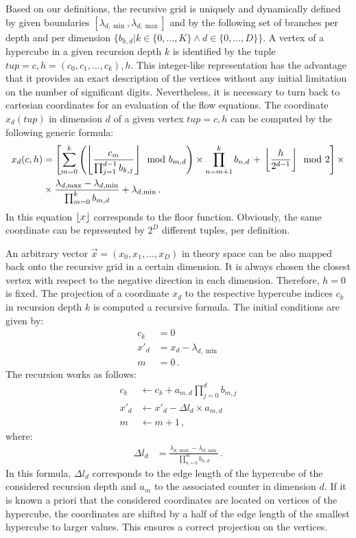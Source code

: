 \documentclass[paper=a4,11pt,bibliography=totoc]{scrartcl}
\DeclarePairedDelimiter\floor{\lfloor}{\rfloor}
\begin{document}
Based on our definitions, the recursive grid is uniquely and dynamically defined by given boundaries $[\lambda_{d,\min}, \lambda_{d,\max}]$ and by the following set of branches per depth and per dimension $\lbrace b_{k, d}|k\in\lbrace0,\ldots,K\rbrace \wedge d\in\lbrace0,\ldots,D\rbrace\rbrace$. A vertex of a hypercube in a given recursion depth $k$ is identified by the tuple $tup = c, h = \left(c_0, c_1, \ldots, c_k\right), h$. This integer-like representation has the advantage that it provides an exact description of the vertices without any initial limitation on the number of significant digits. Nevertheless, it is necessary to turn back to cartesian coordinates for an evaluation of the flow equations. The coordinate $x_d(tup)$ in dimension $d$ of a given vertex $tup=c, h$ can be computed by the following generic formula:
%
\begin{align}
\label{eq:indextocoor}
x_d(c, h) &= \left[\sum_{m=0}^k \left(\floor*{\frac{c_m}{\prod_{j=1}^{d-1} b_{k, j}}} \mod b_{m, d} \right) \times \prod_{n=m+1}^{k} b_{n, d} \,+\, \floor*{\frac{h}{2^{d-1}}} \mod 2\right] \times \nonumber\\
&\times \frac{\lambda_{d,\max} - \lambda_{d,\min}}{\prod_{m=0}^k b_{m, d}} + \lambda_{d,\min}\,.
\end{align}
%
In this equation $\floor*{x}$ corresponds to the floor function. Obviously, the same coordinate can be represented by $2^D$ different tuples, per definition.

An arbitrary vector $\vec{x} = \left(x_0, x_1, \ldots, x_D\right)$ in theory space can be also mapped back onto the recursive grid in a certain dimension. It is always chosen the closest vertex with respect to the negative direction in each dimension. Therefore, $h=0$ is fixed. The projection of a coordinate $x_d$ to the respective hypercube indices $c_k$ in recursion depth $k$ is computed a recursive formula. The initial conditions are given by:
%
\begin{align}
c_k &= 0 \nonumber\\
x'_d &= x_d - \lambda_{d,\min} \nonumber\\
m &= 0\,.
\end{align}
%
The recursion works as follows:
%
\begin{align}
c_k &\leftarrow c_k + a_{m, d} \prod_{j=0}^{d}b_{m, j} \nonumber\\
x'_d &\leftarrow x'_d - \Delta l_d \times a_{m, d} \nonumber\\
m &\leftarrow m + 1\,,
\end{align}
%
where:
%
\begin{align}
\Delta l_d &= \frac{\lambda_{d,\max} - \lambda_{d,\min}}{\prod_{n=0}^{m} b_{n, d}}\,.
\end{align}
%
In this formula, $\Delta l_d$ corresponds to the edge length of the hypercube of the considered recursion depth and $a_m$ to the associated counter in dimension $d$. If it is known a priori that the considered coordinates are located on vertices of the hypercube, the coordinates are shifted by a half of the edge length of the smallest hypercube to larger values. This ensures a correct projection on the vertices.
\end{document}
